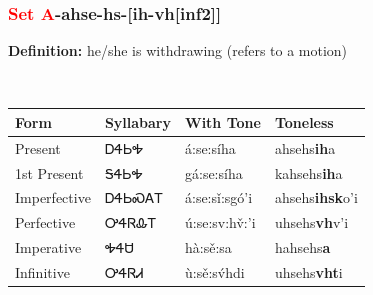 \subsubsection*{\textcolor{Red}{Set A}{-}\textbf{ahse}{-}hs{-}[ih-vh[inf2]]}
\nopagebreak
\textbf{Definition: } he/she is withdrawing (refers to a motion)
\\[0.5em]
\begin{tabularx}{\textwidth}{l X X X}%
\toprule%
\textbf{Form}&\textbf{Syllabary}&\textbf{With Tone}&\textbf{Toneless}\\%
\midrule%
Present&ᎠᏎᏏᎭ&á:se:síha&ahsehs\textbf{ih}a\\%
1st Present&ᎦᏎᏏᎭ&gá:se:síha&kahsehs\textbf{ih}a\\%
Imperfective&ᎠᏎᏏᏍᎪᎢ&á:se:sǐ:sgó’i&ahsehs\textbf{ihsk}o'i\\%
Perfective&ᎤᏎᏒᎲᎢ&ú:se:sv:hv̌:’i&uhsehs\textbf{vh}v'i\\%
Imperative&ᎭᏎᏌ&hà:sě:sa&hahsehs\textbf{a}\\%
Infinitive&ᎤᏎᏒᏗ&ù:sě:sv́hdi&uhsehs\textbf{vht}i\\%
\bottomrule%
\end{tabularx}
\\[1em]